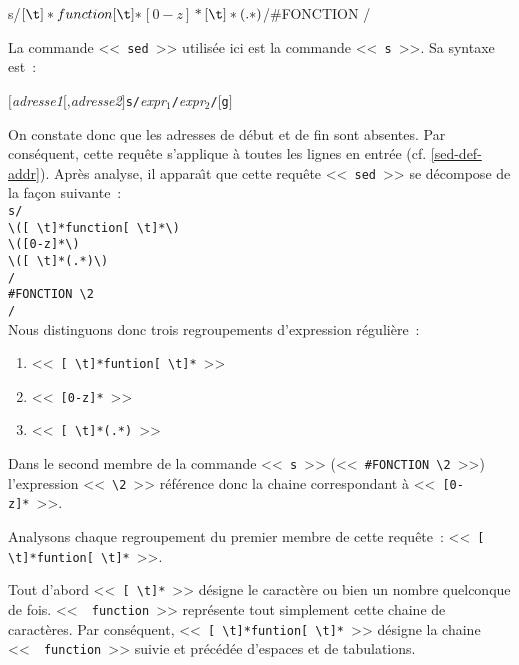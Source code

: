 \begin{example}
\begin{verbatim*}
s/\([ \t]*function[ \t]*\)\([0-z]*\)\([ \t]*(.*)\)/#FONCTION \2/
\end{verbatim*}

La commande <<~{\tt sed}~>> utilis{\'e}e ici est la commande <<~{\tt s}~>>. Sa
syntaxe est~:
\begin{center}
$[${\sl adresse1}$[$,{\sl adresse2}$]${\tt s/}{\it expr$_1$}{\tt /}{\it expr$_2$}{\tt /}$[${\tt g}$]$
\end{center}

On constate donc que les adresses de d{\'e}but et de fin sont absentes. Par
cons{\'e}quent, cette requ{\^e}te s'applique {\`a} toutes les lignes en entr{\'e}e
(cf. \ref{sed-def-addr}). Apr{\`e}s analyse, il appara{\^\i}t que
cette requ{\^e}te <<~{\tt sed}~>> se d{\'e}compose de la fa\c{c}on suivante~:\\[1ex]
{\tt s/}\\
\hspace{0.5cm}\verb*=\([ \t]*function[ \t]*\)=\\
\hspace{0.5cm}\verb*=\([0-z]*\)=\\
\hspace{0.5cm}\verb*=\([ \t]*(.*)\)=\\
{\tt /}\\
\hspace{0.5cm}\verb*=#FONCTION \2=\\
{\tt /}\\[1ex]
Nous distinguons donc trois regroupements d'expression r{\'e}guli{\`e}re~:
\begin{enumerate}
	\item	<<~\verb*=[ \t]*funtion[ \t]*=~>>
	\item	<<~\verb=[0-z]*=~>>
	\item	<<~\verb*=[ \t]*(.*)=~>>
\end{enumerate}
Dans le second membre de la commande <<~{\tt s}~>> (<<~\verb=#FONCTION \2=~>>)
l'expression <<~\verb=\2=~>> r{\'e}f{\'e}rence donc la chaine correspondant {\`a}
<<~\verb=[0-z]*=~>>.

Analysons chaque regroupement du premier membre de cette requ{\^e}te~:
<<~\verb*=[ \t]*funtion[ \t]*=~>>.

Tout d'abord <<~\verb*=[ \t]*=~>> d{\'e}signe le caract{\`e}re
\spacekey ou bien \tabkey un nombre quelconque de fois. <<~{\tt
function}~>> repr{\'e}sente tout simplement cette chaine de caract{\`e}res. Par
cons{\'e}quent, <<~\verb*=[ \t]*funtion[ \t]*=~>> d{\'e}signe la chaine <<~{\tt
function}~>> suivie et pr{\'e}c{\'e}d{\'e}e d'espaces et de tabulations.


\end{example}
